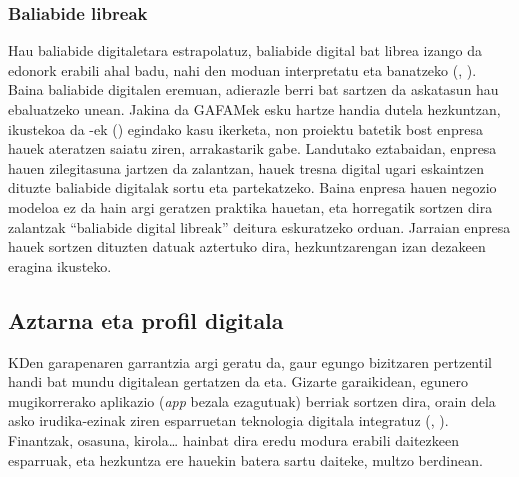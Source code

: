 \subsubsection{Baliabide libreak}\label{subsubsec:baliabidelibre}

Hau baliabide digitaletara estrapolatuz, baliabide digital bat librea izango da edonork erabili ahal badu, nahi den moduan interpretatu eta banatzeko (\citeauthor{butcher2011basic}, \citeyear{butcher2011basic}). Baina baliabide digitalen eremuan, adierazle berri bat sartzen da askatasun hau ebaluatzeko unean. Jakina da GAFAMek esku hartze handia dutela hezkuntzan, ikustekoa da \citeauthor{joseph2019toward}-ek (\citeyear{joseph2019toward}) egindako kasu ikerketa, non proiektu batetik bost enpresa hauek ateratzen saiatu ziren, arrakastarik gabe. Landutako eztabaidan, enpresa hauen zilegitasuna jartzen da zalantzan, hauek tresna digital ugari eskaintzen dituzte baliabide digitalak sortu eta partekatzeko. Baina enpresa hauen negozio modeloa ez da hain argi geratzen praktika hauetan, eta horregatik sortzen dira zalantzak “baliabide digital libreak” deitura eskuratzeko orduan. Jarraian enpresa hauek sortzen dituzten datuak aztertuko dira, hezkuntzarengan izan dezakeen eragina ikusteko.

\subsection{Aztarna eta profil digitala}\label{subsec:aztarna}

KDen garapenaren garrantzia argi geratu da, gaur egungo bizitzaren pertzentil handi bat mundu digitalean gertatzen da eta. Gizarte garaikidean, egunero mugikorrerako aplikazio (\textit{app} bezala ezagutuak) berriak sortzen dira, orain dela asko irudika-ezinak ziren esparruetan teknologia digitala integratuz (\citeauthor{vervier2017perceptions}, \citeyear{vervier2017perceptions}). Finantzak, osasuna, kirola… hainbat dira eredu modura erabili daitezkeen esparruak, eta hezkuntza ere hauekin batera sartu daiteke, multzo berdinean.

